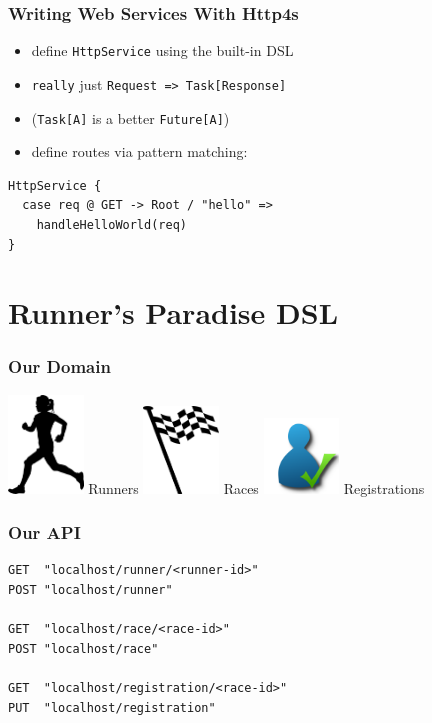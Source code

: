 \documentclass{beamer}
\begin{document}
\begin{frame}[fragile]
  \frametitle{Writing Web Services With Http4s}
  \begin{itemize}
  \item define \texttt{HttpService} using the built-in DSL
  \item \texttt{really} just \texttt{Request => Task[Response]}
  \item (\texttt{Task[A]} is a better \texttt{Future[A]})
  \item define routes via pattern matching:
  \end{itemize}
\begin{verbatim}
HttpService {
  case req @ GET -> Root / "hello" =>
    handleHelloWorld(req)
}
\end{verbatim}
\end{frame}

\section{Runner's Paradise DSL}

\begin{frame}
  \frametitle{Our Domain}
  \begin{center}
    \huge
    \includegraphics[width=2cm]{../pics/runner.png}
    Runners
    \includegraphics[width=2cm]{../pics/race.png}
    Races
    \includegraphics[width=2cm]{../pics/registration.png}
    Registrations
  \end{center}
\end{frame}

\begin{frame}[fragile]
  \frametitle{Our API}
\begin{verbatim}
GET  "localhost/runner/<runner-id>"
POST "localhost/runner"

GET  "localhost/race/<race-id>"
POST "localhost/race"

GET  "localhost/registration/<race-id>"
PUT  "localhost/registration"
\end{verbatim}
\end{frame}
\end{document}
